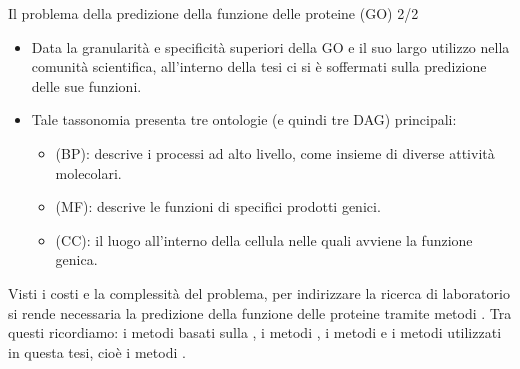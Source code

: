 \documentclass[9pt]{beamer}
\begin{document}
\begin{tframe}{Il problema della predizione della funzione delle proteine (GO) 2/2}
\begin{itemize}
\item Data la granularità e specificità superiori della GO e il suo largo utilizzo nella comunità scientifica, all’interno della tesi ci si è soffermati sulla predizione delle sue funzioni.
\item Tale tassonomia presenta tre ontologie (e quindi tre DAG) principali:
\begin{itemize}
\item {} (BP): descrive i processi ad alto livello, come insieme di diverse attività molecolari.
\item {} (MF): descrive le funzioni di specifici prodotti genici.
\item {} (CC): il luogo all’interno della cellula nelle quali avviene la funzione genica.
\end{itemize}
\end{itemize}  
Visti i costi e la complessità del problema, per indirizzare la ricerca di laboratorio si rende necessaria la predizione della funzione delle proteine tramite metodi . Tra questi ricordiamo: i metodi basati sulla , i metodi , i metodi  e i metodi utilizzati in questa tesi, cioè i metodi .
\end{tframe}

\end{document}
